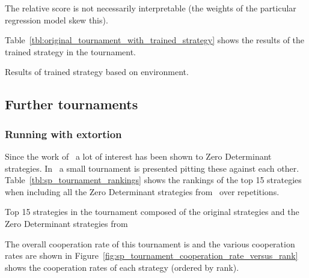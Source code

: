 \documentclass{article}
\begin{document}
The relative score is not necessarily interpretable (the weights of the
particular regression model skew this).

Table~\ref{tbl:original_tournament_with_trained_strategy} shows the results of
the trained strategy in the tournament.

\begin{table}[!hbtp]
        \centering
        \tiny
        
        \caption{Results of trained strategy based on environment.}
         \label{tbl:original_tournament_with_trained_strategy}
\end{table}


\subsection{Further tournaments}


\subsubsection{Running with extortion}\label{sec:run_with_stewart_plotkin}

Since the work of~\cite{Press2012} a lot of interest has been shown to Zero
Determinant strategies. In~\cite{Stewart2012} a small tournament is presented
pitting these against each other. Table~\ref{tbl:sp_tournament_rankings}
shows the rankings of the top 15 strategies when including all the Zero
Determinant strategies from~\cite{Stewart2012} over
repetitions.

\begin{table}[!hbtp]
        \centering
        
        \caption{Top 15 strategies in the tournament composed of the original
                 strategies and the Zero Determinant strategies
                 from~\cite{Stewart2012}}
        \label{tbl:sp_tournament_rankings}
\end{table}

The overall cooperation rate of this tournament is
and the various
cooperation rates are shown in
Figure~\ref{fig:sp_tournament_cooperation_rate_versus_rank} shows the
cooperation rates of each strategy (ordered by rank).
\end{document}
